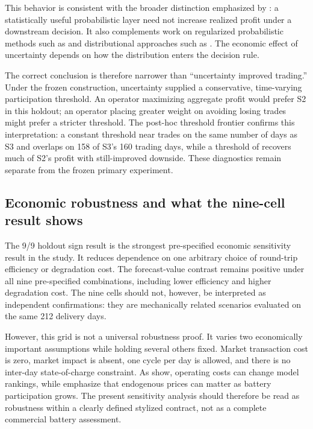 This behavior is consistent with the broader distinction emphasized by \citet{nitka2023}: a statistically useful probabilistic layer need not increase realized profit under a downstream decision. It also complements work on regularized probabilistic methods such as \citet{uniejewskiweron2021} and distributional approaches such as \citet{marcjasz2023}. The economic effect of uncertainty depends on how the distribution enters the decision rule.

The correct conclusion is therefore narrower than ``uncertainty improved trading.'' Under the frozen construction, uncertainty supplied a conservative, time-varying participation threshold. An operator maximizing aggregate profit would prefer S2 in this holdout; an operator placing greater weight on avoiding losing trades might prefer a stricter threshold. The post-hoc threshold frontier confirms this interpretation: a constant threshold near  trades on the same number of days as S3 and overlaps on 158 of S3's 160 trading days, while a threshold of  recovers much of S2's profit with still-improved downside. These diagnostics remain separate from the frozen primary experiment.
\subsection{Economic robustness and what the nine-cell result shows}

The 9/9 holdout sign result is the strongest pre-specified economic sensitivity result in the study. It reduces dependence on one arbitrary choice of round-trip efficiency or degradation cost. The forecast-value contrast remains positive under all nine pre-specified combinations, including lower efficiency and higher degradation cost. The nine cells should not, however, be interpreted as independent confirmations: they are mechanically related scenarios evaluated on the same 212 delivery days.

However, this grid is not a universal robustness proof. It varies two economically important assumptions while holding several others fixed. Market transaction cost is zero, market impact is absent, one cycle per day is allowed, and there is no inter-day state-of-charge constraint. As \citet{serafin2025} show, operating costs can change model rankings, while \citet{veenstra2025} emphasize that endogenous prices can matter as battery participation grows. The present sensitivity analysis should therefore be read as robustness within a clearly defined stylized contract, not as a complete commercial battery assessment.

